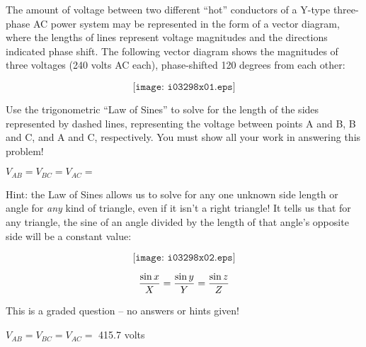 

The amount of voltage between two different ``hot'' conductors of a Y-type three-phase AC power system may be represented in the form of a vector diagram, where the lengths of lines represent voltage magnitudes and the directions indicated phase shift.  The following vector diagram shows the magnitudes of three voltages (240 volts AC each), phase-shifted 120 degrees from each other:

$$\texttt{[image: i03298x01.eps]}$$

Use the trigonometric ``Law of Sines'' to solve for the length of the sides represented by dashed lines, representing the voltage between points A and B, B and C, and A and C, respectively.  You must show all your work in answering this problem!

\vskip 50pt

$V_{AB} = V_{BC} = V_{AC} = $

\vfil 

Hint: the Law of Sines allows us to solve for any one unknown side length or angle for {\it any} kind of triangle, even if it isn't a right triangle!  It tells us that for any triangle, the sine of an angle divided by the length of that angle's opposite side will be a constant value:

$$\texttt{[image: i03298x02.eps]}$$

$${\sin x \over X} = {\sin y \over Y} = {\sin z \over Z}$$

\eject






This is a graded question -- no answers or hints given!







$V_{AB} = V_{BC} = V_{AC} = $ 415.7 volts




